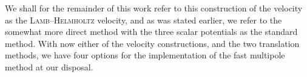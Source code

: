 \noindent
We shall for the remainder of this work refer to this construction of the velocity as the \textsc{Lamb}--\textsc{Helmholtz} velocity, and as was stated earlier, we refer to the somewhat more direct method with the three scalar potentials as the standard method.
With now either of the velocity constructions, and the two translation methods, we have four options for the implementation of the fast multipole method at our disposal.
